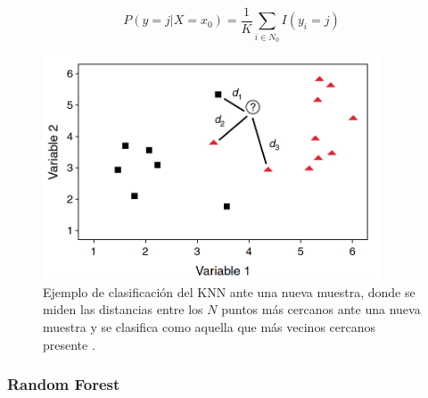 \documentclass{uathesis-es}
\begin{document}
\[
    P(y = j | X = x_0)  = \frac{1}{K} \sum_{i\in N_0} I(y_i = j)
\]

\begin{figure}[H]
    \centering
    \includegraphics[width=10cm]{Figures/Background/KNN.png}
    \caption{Ejemplo de clasificación del KNN ante una nueva muestra, donde se miden las distancias entre los $N$ puntos más cercanos ante una nueva muestra y se clasifica como aquella que más vecinos cercanos presente \cite{VIDUEIRAFERREIRA2015195}.}
    \label{GA_inicializacion}
\end{figure}


\subsubsection*{Random Forest}
\label{RF_INTRODUCTION_TO_ENSEMBLES}

\end{document}
